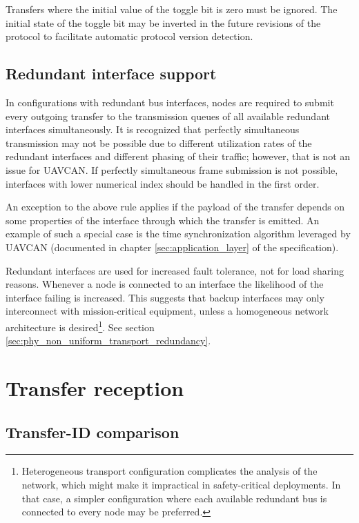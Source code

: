 Transfers where the initial value of the toggle bit is zero must be ignored.
The initial state of the toggle bit may be inverted in the future revisions of the protocol
to facilitate automatic protocol version detection.

\subsection{Redundant interface support}

In configurations with redundant bus interfaces,
nodes are required to submit every outgoing transfer to the transmission queues of
all available redundant interfaces simultaneously.
It is recognized that perfectly simultaneous transmission may not be possible due to different
utilization rates of the redundant interfaces and different phasing of their traffic;
however, that is not an issue for UAVCAN.
If perfectly simultaneous frame submission is not possible, interfaces with lower numerical index
should be handled in the first order.

An exception to the above rule applies if the payload of the transfer depends on some properties
of the interface through which the transfer is emitted.
An example of such a special case is the time synchronization algorithm leveraged by UAVCAN
(documented in chapter \ref{sec:application_layer} of the specification).

Redundant interfaces are used for increased fault tolerance, not for load sharing reasons.
Whenever a node is connected to an interface the likelihood of the interface failing is increased.
This suggests that backup interfaces may only interconnect with mission-critical equipment,
unless a homogeneous network architecture is desired\footnote{Heterogeneous transport configuration
complicates the analysis of the network, which might make it impractical in safety-critical deployments.
In that case, a simpler configuration where each available redundant bus is connected to every node may be
preferred.}.
See section \ref{sec:phy_non_uniform_transport_redundancy}.

\section{Transfer reception}\label{sec:transfer_reception}

\subsection{Transfer-ID comparison}\label{sec:transfer_id_forward_distance}


